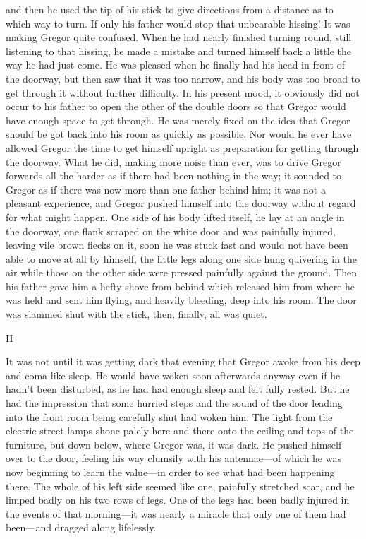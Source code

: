 and then he used the tip of his stick to give directions from a
distance as to which way to turn. If only his father would stop that
unbearable hissing! It was making Gregor quite confused. When he had
nearly finished turning round, still listening to that hissing, he made
a mistake and turned himself back a little the way he had just come. He
was pleased when he finally had his head in front of the doorway, but
then saw that it was too narrow, and his body was too broad to get
through it without further difficulty. In his present mood, it
obviously did not occur to his father to open the other of the double
doors so that Gregor would have enough space to get through. He was
merely fixed on the idea that Gregor should be got back into his room
as quickly as possible. Nor would he ever have allowed Gregor the time
to get himself upright as preparation for getting through the doorway.
What he did, making more noise than ever, was to drive Gregor forwards
all the harder as if there had been nothing in the way; it sounded to
Gregor as if there was now more than one father behind him; it was not
a pleasant experience, and Gregor pushed himself into the doorway
without regard for what might happen. One side of his body lifted
itself, he lay at an angle in the doorway, one flank scraped on the
white door and was painfully injured, leaving vile brown flecks on it,
soon he was stuck fast and would not have been able to move at all by
himself, the little legs along one side hung quivering in the air while
those on the other side were pressed painfully against the ground. Then
his father gave him a hefty shove from behind which released him from
where he was held and sent him flying, and heavily bleeding, deep into
his room. The door was slammed shut with the stick, then, finally, all
was quiet.




\act II


It was not until it was getting dark that evening that Gregor awoke
from his deep and coma-like sleep. He would have woken soon afterwards
anyway even if he hadn’t been disturbed, as he had had enough sleep and
felt fully rested. But he had the impression that some hurried steps
and the sound of the door leading into the front room being carefully
shut had woken him. The light from the electric street lamps shone
palely here and there onto the ceiling and tops of the furniture, but
down below, where Gregor was, it was dark. He pushed himself over to
the door, feeling his way clumsily with his antennae—of which he was
now beginning to learn the value—in order to see what had been
happening there. The whole of his left side seemed like one, painfully
stretched scar, and he limped badly on his two rows of legs. One of the
legs had been badly injured in the events of that morning—it was nearly
a miracle that only one of them had been—and dragged along lifelessly.

